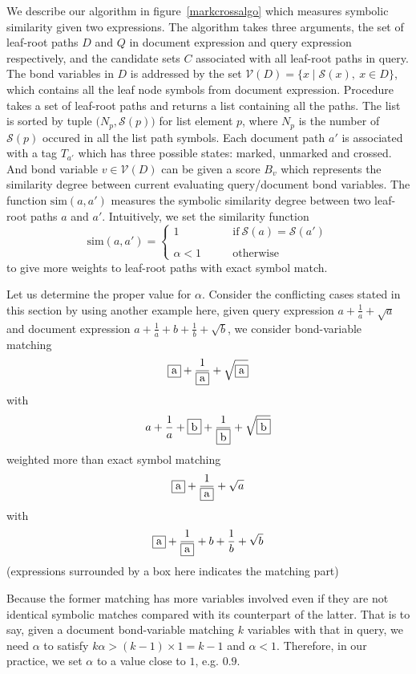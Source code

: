 \documentclass{acm_proc_article-sp}
\begin{document}
We describe our algorithm in figure~\ref{markcrossalgo} which measures symbolic similarity given two expressions. 
The  algorithm takes 
three arguments, the set of leaf-root paths $D$ and $Q$ in document expression and query expression respectively, and the candidate sets $C$ associated with all leaf-root paths in query. 
The bond variables in $D$ is addressed by the set $\mathcal{V}(D) = \{x \mid \mathcal{S}(x),\ x \in D\}$, which contains all the leaf node symbols from document expression.
Procedure  takes a set of leaf-root paths and returns a list containing all the paths. 
The list is sorted by tuple $\big(N_p, \mathcal{S}(p)\big)$ for list element $p$, where $N_p$ is the number of $\mathcal{S}(p)$ occured in all the list path symbols. 
Each document path $a'$ is associated with a tag $T_{a'}$ which has three possible states: marked, unmarked and crossed. And bond variable $v \in \mathcal{V}(D)$ can be given a score $B_v$ which represents the similarity degree between current evaluating query/document bond variables. 
The function $\mathrm{sim}(a,a')$ measures the symbolic similarity degree between two leaf-root paths $a$ and $a'$. 
Intuitively, we set the similarity function
$$
\mathrm{sim}(a,a') = 
\left\{
\begin{array}{ll}
1    &\qquad \mathrm{if}\  \mathcal{S}(a) = \mathcal{S}(a')
\\
\\
\alpha < 1  &\qquad \mathrm{otherwise}
\end{array}
\right.
$$
to give more weights to leaf-root paths with exact symbol match.

Let us determine the proper value for $\alpha$. 
Consider the conflicting cases stated in this section by using another example here, 
given query expression $a+\frac 1 a + \sqrt{a}$ and document expression $a+\frac 1 a + b + \frac 1 b + \sqrt{b}$, we consider bond-variable matching 
$$\fbox{a}+\dfrac 1 {\fbox{a}} + \sqrt{\fbox{a}}$$
with 
$$a+\dfrac 1 a + \fbox{b} + \dfrac 1 {\fbox{b}} + \sqrt{\fbox{b}}$$
weighted more than exact symbol matching 
$$\fbox{a}+\dfrac 1 {\fbox{a}} + \sqrt{a}$$ 
with 
$$\fbox{a}+\dfrac 1 {\fbox{a}} + b + \dfrac 1 b + \sqrt{b}$$
(expressions surrounded by a box here indicates the matching part)

Because the former matching has more variables involved even if they are not identical symbolic matches compared with its counterpart of the latter. 
That is to say, given a document bond-variable matching $k$ variables with that in query, we need $\alpha$ to satisfy $ k \alpha > (k-1) \times 1 = k - 1 $
and $\alpha < 1$. 
Therefore, in our practice, we set $\alpha$ to a value close to $1$, e.g. $0.9$.
\end{document}

